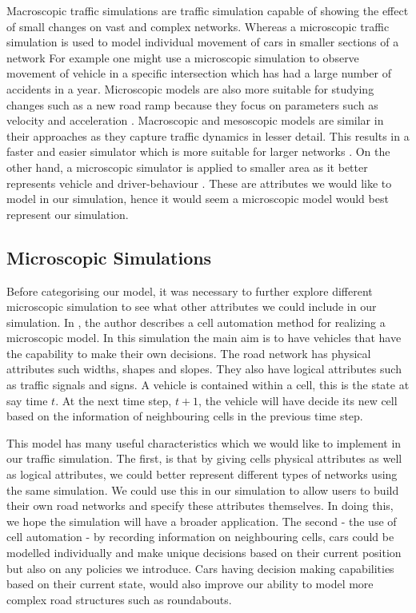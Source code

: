 \documentclass{article}
\begin{document}
	Macroscopic traffic simulations are traffic simulation capable of showing the effect of small changes on vast and complex networks. Whereas a microscopic traffic simulation is used to model individual movement of cars  in smaller sections of a network For example one might use a microscopic simulation to observe movement of vehicle in a specific intersection which has had a large number of accidents in a year. Microscopic models are also more suitable for studying changes such as a new road ramp because they focus on parameters such as velocity and acceleration \cite{sokolowski2011principles}. Macroscopic and mesoscopic models are similar in their approaches as they capture traffic dynamics in lesser detail. This results in a faster and easier simulator which is more suitable for larger networks . 
	On the other hand, a microscopic simulator is applied to smaller area as it better represents vehicle and driver-behaviour \cite{burghout2005hybrid}. These are attributes we would like to model in our simulation, hence it would seem a microscopic model would best represent our simulation. 
	
	
	\subsection{Microscopic Simulations}
	
	Before categorising our model, it was necessary to further explore different microscopic simulation to see what other attributes we could include in our simulation.
	In \cite{namekawa2005general}, the author describes a cell automation method for realizing a microscopic model. In this simulation the main aim is to have vehicles that have the capability to make their own decisions. The road network has physical attributes such widths, shapes and slopes. They also have logical attributes such as traffic signals and signs. A vehicle is contained within a cell, this is the state at say time $t$. At the next time step, $t+1$, the vehicle will have decide its new cell based on the information of neighbouring cells in the previous time step. 
	
	This model has many useful characteristics which we would like to implement in our traffic simulation. The first, is that by giving cells physical attributes as well as logical attributes, we could better represent different types of networks using the same simulation. We could use this in our simulation to allow users to build their own road networks and specify these attributes themselves. In doing this, we hope the simulation will have a broader application. The second - the use of cell automation - by recording information on neighbouring cells, cars could be modelled individually and make unique decisions based on their current position but also on any policies we introduce. Cars having decision making capabilities based on their current state, would also improve our ability to model more complex road structures such as roundabouts.  
	
\end{document}

